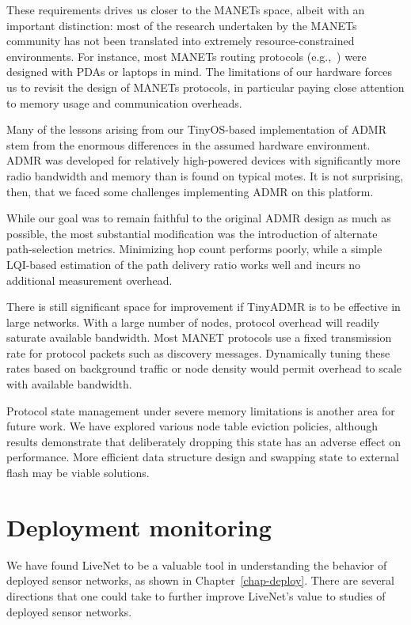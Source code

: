 These requirements drives us closer to the MANETs space, albeit with an
important distinction: most of the research undertaken by the MANETs community
has not been translated into extremely resource-constrained environments. For
instance, most MANETs routing protocols
(e.g.,~\cite{admr-mobihoc01,aodv,dsr,dsdv}) were designed with PDAs or laptops
in mind. The limitations of our hardware forces us to revisit the design of
MANETs protocols, in particular paying close attention to memory usage and
communication overheads.

Many of the lessons arising from our TinyOS-based implementation of 
ADMR stem from the enormous differences in the assumed hardware
environment. ADMR was developed for relatively high-powered
devices with significantly more radio bandwidth and memory than
is found on typical motes. It is not surprising, then, that 
we faced some challenges implementing ADMR on this platform.

While our goal was to remain faithful to the original ADMR design as
much as possible, the most substantial modification was the introduction
of alternate path-selection metrics. Minimizing hop count performs
poorly, while a simple LQI-based estimation of the path delivery ratio
works well and incurs no additional measurement overhead. 

There is still significant space for improvement 
if TinyADMR is to be effective in large networks. With a large number
of nodes, protocol overhead will readily saturate available bandwidth.
Most MANET protocols use a fixed transmission rate for protocol
packets such as discovery messages. Dynamically tuning these rates
based on background traffic or node density would permit overhead
to scale with available bandwidth. 

Protocol state management under severe memory limitations is another 
area for future work. We have explored various node table eviction
policies, although results demonstrate that deliberately dropping
this state has an adverse effect on performance. More efficient
data structure design and swapping state to external flash may be
viable solutions.


\section{Deployment monitoring}

We have found LiveNet to be a valuable tool in understanding the behavior of
deployed sensor networks, as shown in Chapter~\ref{chap-deploy}. There are
several directions that one could take to further improve LiveNet's
value to studies of deployed sensor networks.

